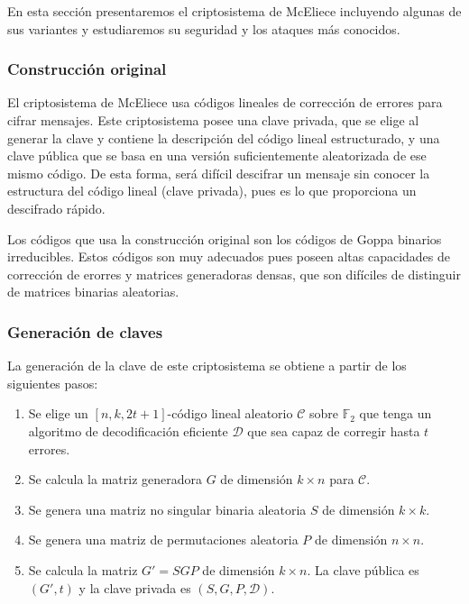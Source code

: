 En esta sección presentaremos el criptosistema de McEliece incluyendo algunas de sus variantes y estudiaremos su seguridad y los ataques más conocidos.

\subsubsection{Construcción original}

El criptosistema de McEliece usa códigos lineales de corrección de errores para cifrar mensajes. Este criptosistema posee una clave privada, que se elige al generar la clave y contiene la descripción del código lineal estructurado, y una clave pública que se basa en una versión suficientemente aleatorizada de ese mismo código. De esta forma, será difícil descifrar un mensaje sin conocer la estructura del código lineal (clave privada), pues es lo que proporciona un descifrado rápido.

Los códigos que usa la construcción original son los códigos de Goppa binarios irreducibles. Estos códigos son muy adecuados pues poseen altas capacidades de corrección de erorres y matrices generadoras densas, que son difíciles de distinguir de matrices binarias aleatorias.

\subsubsection{Generación de claves}

La generación de la clave de este criptosistema se obtiene a partir de los siguientes pasos:

\begin{enumerate}
    \item Se elige un $[n, k, 2t + 1]$-código lineal aleatorio $\mathcal{C}$ sobre $\mathbb{F}_2$ que tenga un algoritmo de decodificación eficiente $\mathcal{D}$ que sea capaz de corregir hasta $t$ errores.
    \item Se calcula la matriz generadora $G$ de dimensión $k \times n$ para $\mathcal{C}$.
    \item Se genera una matriz no singular binaria aleatoria $S$ de dimensión $k \times k$.
    \item Se genera una matriz de permutaciones aleatoria $P$ de dimensión $n \times n$.
    \item Se calcula la matriz $G' = SGP$ de dimensión $k \times n$. La clave pública es $(G', t)$ y la clave privada es $(S, G, P, \mathcal{D})$.
\end{enumerate}

